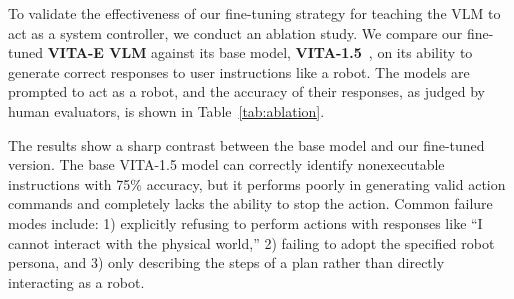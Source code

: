 To validate the effectiveness of our fine-tuning strategy for teaching the VLM to act as a system controller, we conduct an ablation study. We compare our fine-tuned \textbf{VITA-E VLM} against its base model, \textbf{VITA-1.5}~\citep{vita15}, on its ability to generate correct responses to user instructions like a robot. The models are prompted to act as a robot, and the accuracy of their responses, as judged by human evaluators, is shown in Table~\ref{tab:ablation}.

\begin{table}[!t]
	\caption{Ablation study: Accuracy of the VLM in generating appropriate responses and control tokens before and after fine-tuning.}
	\label{tab:ablation}
	\centering
\end{table}

The results show a sharp contrast between the base model and our fine-tuned version. The base VITA-1.5 model can correctly identify nonexecutable instructions with 75\% accuracy, but it performs poorly in generating valid action commands and completely lacks the ability to stop the action. Common failure modes include: 1) explicitly refusing to perform actions with responses like ``I cannot interact with the physical world,'' 2) failing to adopt the specified robot persona, and 3) only describing the steps of a plan rather than directly interacting as a robot.

